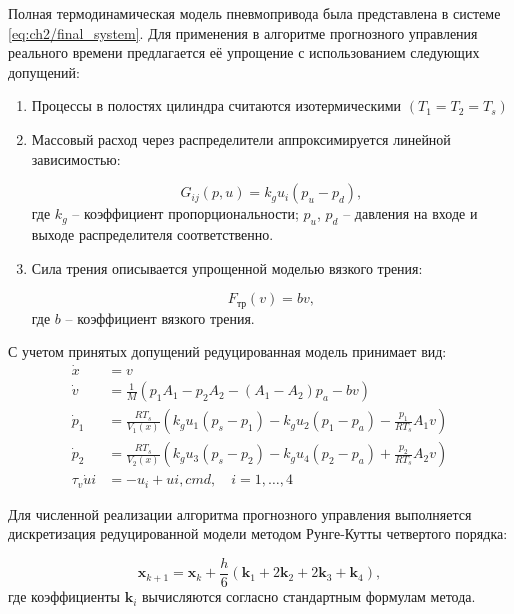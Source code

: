 Полная термодинамическая модель пневмопривода была представлена в системе \ref{eq:ch2/final_system}. Для применения в
алгоритме прогнозного управления реального времени предлагается её упрощение с использованием следующих допущений:

\begin{enumerate}
	\item Процессы в полостях цилиндра считаются изотермическими $(T_1 = T_2 = T_s)$
	\item Массовый расход через распределители аппроксимируется линейной зависимостью:

	      \begin{equation}
		      G_{ij}(p,u) = k_g u_i (p_u - p_d),
	      \end{equation}
	      где $k_g$ -- коэффициент пропорциональности;
	      $p_u$, $p_d$ -- давления на входе и выходе распределителя соответственно.

	\item Сила трения описывается упрощенной моделью вязкого трения:

	      \begin{equation}
		      F_{\text{тр}}(v) = b v,
	      \end{equation}
	      где $b$ -- коэффициент вязкого трения.
\end{enumerate}

С учетом принятых допущений редуцированная модель принимает вид:
\begin{equation}
	\begin{aligned}
		\dot{x}        & = v                                                                                   \\
		\dot{v}        & = \frac{1}{M}(p_1A_1 - p_2A_2 - (A_1-A_2)p_a - bv)                                    \\
		\dot{p}_1      & = \frac{RT_s}{V_1(x)}(k_g u_1(p_s - p_1) - k_g u_2(p_1 - p_a) - \frac{p_1}{RT_s}A_1v) \\
		\dot{p}_2      & = \frac{RT_s}{V_2(x)}(k_g u_3(p_s - p_2) - k_g u_4(p_2 - p_a) + \frac{p_2}{RT_s}A_2v) \\
		\tau_v\dot{u}i & = -u_i + u{i,cmd}, \quad i = 1,\ldots,4
	\end{aligned}
\end{equation}

Для численной реализации алгоритма прогнозного управления выполняется
дискретизация редуцированной модели методом Рунге-Кутты четвертого порядка:

\begin{equation}
	\mathbf{x}_{k+1} = \mathbf{x}_k + \frac{h}{6}(\mathbf{k}_1 + 2\mathbf{k}_2 + 2\mathbf{k}_3 + \mathbf{k}_4),
\end{equation}
где коэффициенты $\mathbf{k}_i$ вычисляются согласно стандартным формулам метода.

